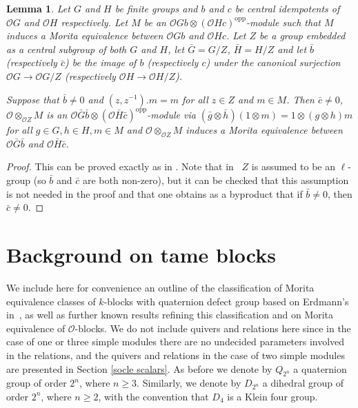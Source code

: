 \documentclass{amsart}
\theoremstyle{plain}\newtheorem{Theorem}{Theorem}[section]
\theoremstyle{plain}\newtheorem{Conjecture}[Theorem]{Conjecture}
\theoremstyle{plain}\newtheorem{Corollary}[Theorem]{Corollary}
\theoremstyle{plain}\newtheorem{Lemma}[Theorem]{Lemma}
\theoremstyle{plain}\newtheorem{Proposition}[Theorem]{Proposition}
\theoremstyle{definition}\newtheorem{Definition}[Theorem]{Definition}
\theoremstyle{definition}\newtheorem{Example}[Theorem]{Example}
\theoremstyle{definition}\newtheorem{Examples}[Theorem]{Examples}
\theoremstyle{definition}\newtheorem{Exercise}[Theorem]{Exercise}
\theoremstyle{definition}\newtheorem{Notation}[Theorem]{Notation}
\theoremstyle{definition}\newtheorem{Remark}[Theorem]{Remark}
\theoremstyle{definition}\newtheorem{Remarks}[Theorem]{Remarks}
\def\CO{{\mathcal{O}}}    \def\OPE{{\mathcal{O}(P\rtimes E)}}
\def\opp{\mathrm{opp}}
\numberwithin{equation}{section}
\begin{document}
\begin{Lemma} \label{lem:centraldomination}   Let  $G$  and $H$ be  finite groups  and $b$ and  $c$  be central idempotents of  $\CO G $ and $ \CO H$ respectively. 
Let $M$ be an $\CO Gb  \otimes  (\CO  Hc)^{\opp}$-module  such that $M$ induces a Morita equivalence between $\CO Gb$ and $\CO Hc$. Let $Z$ be a group embedded as a central subgroup of both $G$  and $H$, let  $\bar  G = G/Z$, $\bar H =H/Z$  and let 
$\bar b$  (respectively $\bar c$) be the image of  $b$ (respectively $c$) under the canonical surjection $\CO G \to \CO G/Z$ (respectively $\CO H \to  \CO  H/Z $).

Suppose that  $\bar b \ne 0$ and $(z, z^{-1}).m=m$  for all  $z \in Z$ and $m \in M$.   Then  $\bar c\ne 0 $, $\CO  \otimes_{\CO  Z} M$  is  an  
$\CO \bar G\bar b  \otimes (\CO \bar H \bar c)^{\opp}$-module via  $(\bar g \otimes  \bar h)(1 \otimes m ) =  1\otimes (g \otimes h)m $ for all $g \in G, h\in H, m\in M$  and  $\CO \otimes_{\CO Z} M$  induces a Morita equivalence between $\CO \bar G \bar b$ and $\CO  \bar H \bar c$.
\end{Lemma}

\begin{proof}   This can be proved exactly as in  \cite[Lem.~2.9]{EKKS}. Note that in~\cite{EKKS} $Z$ is  assumed to be an $\ell$-group (so  $\bar b$ and $\bar c $ are both non-zero), but it can be checked that  this assumption  is not needed  in the proof  and that one obtains as a  byproduct that  if $\bar b \ne 0 $, then $\bar c \ne$0.\end{proof}






\section{Background on tame blocks}\label{sec:tamebackground}

We include here for convenience an outline of the classification of Morita equivalence
classes of $k$-blocks with quaternion defect group based on Erdmann's in~\cite{er90}, 
as well as further known results refining this classification and on Morita equivalence of 
$\CO$-blocks. We do not include quivers and relations here since in the case of one 
or three simple modules there are no undecided parameters involved in the relations, 
and the quivers and relations in the case of two simple modules are presented in 
Section \ref{socle scalars}. As before  we denote 
by $Q_{2^n}$ a quaternion group of order $2^n$, where $n\geq 3$.
Similarly, we denote by $D_{2^n}$ a dihedral group of order $2^n$, where
$n\geq 2$, with the convention that $D_4$ is a Klein four group. 
\end{document}
